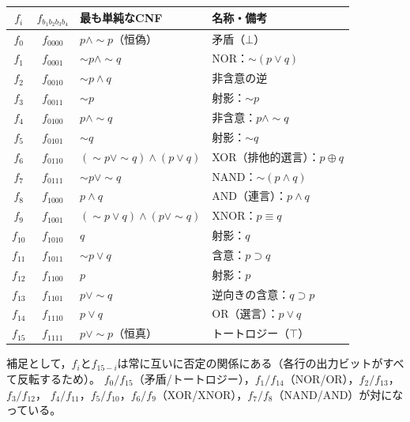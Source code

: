 \documentclass[autodetect-engine,dvi=dvipdfmx,ja=standard]{bxjsarticle}
\begin{document}
\begin{center}
\begin{longtable}{c|c|l|l}
\toprule
\(f_i\) & \(f_{b_1b_2b_3b_4}\) & 最も単純なCNF & 名称・備考 \\
\midrule
\endhead
\(f_0\) & \(f_{0000}\) & \(p\land\sim p\)（恒偽） & 矛盾（\(\bot\)） \\
\(f_1\) & \(f_{0001}\) & \(\sim p\land\sim q\) & NOR：\(\sim(p\lor q)\) \\
\(f_2\) & \(f_{0010}\) & \(\sim p\land q\) & 非含意の逆 \\
\(f_3\) & \(f_{0011}\) & \(\sim p\) & 射影：\(\sim p\) \\
\(f_4\) & \(f_{0100}\) & \(p\land\sim q\) & 非含意：\(p\land\sim q\) \\
\(f_5\) & \(f_{0101}\) & \(\sim q\) & 射影：\(\sim q\) \\
\(f_6\) & \(f_{0110}\) & \((\sim p\lor\sim q)\land(p\lor q)\) & XOR（排他的選言）：\(p\oplus q\) \\
\(f_7\) & \(f_{0111}\) & \(\sim p\lor\sim q\) & NAND：\(\sim(p\land q)\) \\
\(f_8\) & \(f_{1000}\) & \(p\land q\) & AND（連言）：\(p\land q\) \\
\(f_9\) & \(f_{1001}\) & \((\sim p\lor q)\land(p\lor\sim q)\) & XNOR：\(p\equiv q\) \\
\(f_{10}\) & \(f_{1010}\) & \(q\) & 射影：\(q\) \\
\(f_{11}\) & \(f_{1011}\) & \(\sim p\lor q\) & 含意：\(p\supset q\) \\
\(f_{12}\) & \(f_{1100}\) & \(p\) & 射影：\(p\) \\
\(f_{13}\) & \(f_{1101}\) & \(p\lor\sim q\) & 逆向きの含意：\(q\supset p\) \\
\(f_{14}\) & \(f_{1110}\) & \(p\lor q\) & OR（選言）：\(p\lor q\) \\
\(f_{15}\) & \(f_{1111}\) & \(p\lor\sim p\)（恒真） & トートロジー（\(\top\)） \\
\bottomrule
\end{longtable}
\end{center}

補足として，\(f_i\)と\(f_{15-i}\)は常に互いに否定の関係にある（各行の出力ビットがすべて反転するため）。
\(f_0/f_{15}\)（矛盾/トートロジー），\(f_1/f_{14}\)（NOR/OR），\(f_2/f_{13}\)，\(f_3/f_{12}\)，
\(f_4/f_{11}\)，\(f_5/f_{10}\)，\(f_6/f_9\)（XOR/XNOR），\(f_7/f_8\)（NAND/AND）が対になっている。
\end{document}
